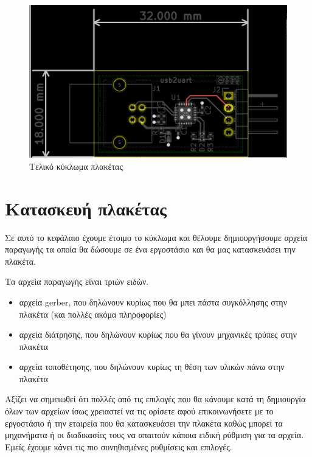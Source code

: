 \documentclass[a4paper]{article}
\begin{document}
\begin{figure}
  \begin{center}
    \includegraphics[width=.9\textwidth]{img/final-pcb.png}
    \caption{Τελικό κύκλωμα πλακέτας}
    \label{fig:final-pcb}
  \end{center}
\end{figure}


\section{Κατασκευή πλακέτας}
Σε αυτό το κεφάλαιο έχουμε έτοιμο το κύκλωμα και θέλουμε δημιουργήσουμε αρχεία παραγωγής τα οποία θα δώσουμε σε ένα εργοστάσιο και θα μας κατασκευάσει την πλακέτα. 

Τα αρχεία παραγωγής είναι τριών ειδών.

\begin{itemize}
    \item αρχεία gerber, που δηλώνουν κυρίως που θα μπει πάστα συγκόλλησης στην πλακέτα (και πολλές ακόμα πληροφορίες)
    \item αρχεία διάτρησης, που δηλώνουν κυρίως που θα γίνουν μηχανικές τρύπες στην πλακέτα
    \item αρχεία τοποθέτησης, που δηλώνουν κυρίως τη θέση των υλικών πάνω στην πλακέτα
\end{itemize}

Αξίζει να σημειωθεί ότι πολλές από τις επιλογές που θα κάνουμε κατά τη δημιουργία όλων των αρχείων ίσως χρειαστεί να τις ορίσετε αφού επικοινωνήσετε με το εργοστάσιο ή την εταιρεία που θα κατασκευάσει την πλακέτα καθώς μπορεί τα μηχανήματα ή οι διαδικασίες τους να απαιτούν κάποια ειδική ρύθμιση για τα αρχεία. Εμείς έχουμε κάνει τις πιο συνηθισμένες ρυθμίσεις και επιλογές.
\end{document}
